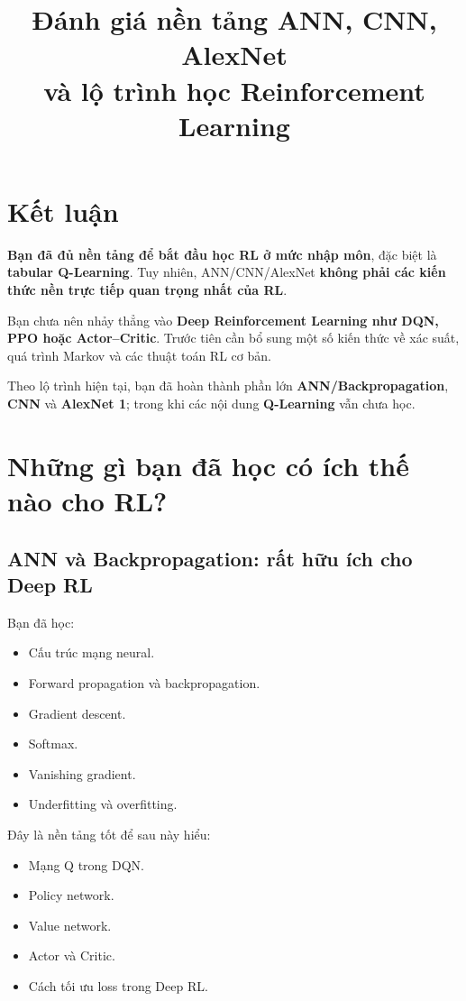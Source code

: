 \documentclass[12pt,a4paper]{article}
\title{\textbf{Đánh giá nền tảng ANN, CNN, AlexNet\\và lộ trình học Reinforcement Learning}}
\author{}
\date{}
\begin{document}
\maketitle
\tableofcontents
\newpage

\section{Kết luận}

\textbf{Bạn đã đủ nền tảng để bắt đầu học RL ở mức nhập môn}, đặc biệt là \textbf{tabular Q-Learning}. Tuy nhiên, ANN/CNN/AlexNet \textbf{không phải các kiến thức nền trực tiếp quan trọng nhất của RL}.

Bạn chưa nên nhảy thẳng vào \textbf{Deep Reinforcement Learning như DQN, PPO hoặc Actor--Critic}. Trước tiên cần bổ sung một số kiến thức về xác suất, quá trình Markov và các thuật toán RL cơ bản.

Theo lộ trình hiện tại, bạn đã hoàn thành phần lớn \textbf{ANN/Backpropagation}, \textbf{CNN} và \textbf{AlexNet 1}; trong khi các nội dung \textbf{Q-Learning} vẫn chưa học.

\section{Những gì bạn đã học có ích thế nào cho RL?}

\subsection{ANN và Backpropagation: rất hữu ích cho Deep RL}

Bạn đã học:

\begin{itemize}[leftmargin=1.5em]
    \item Cấu trúc mạng neural.
    \item Forward propagation và backpropagation.
    \item Gradient descent.
    \item Softmax.
    \item Vanishing gradient.
    \item Underfitting và overfitting.
\end{itemize}

Đây là nền tảng tốt để sau này hiểu:

\begin{itemize}[leftmargin=1.5em]
    \item Mạng Q trong DQN.
    \item Policy network.
    \item Value network.
    \item Actor và Critic.
    \item Cách tối ưu loss trong Deep RL.
\end{itemize}
\end{document}

